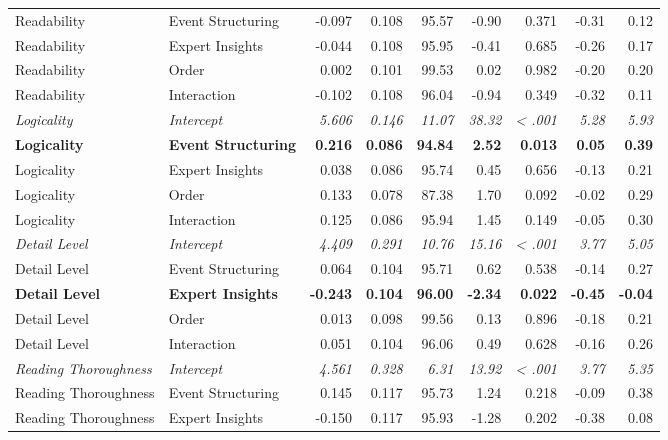\begin{longtable}{l l r r r r r r r}
  Readability & Event Structuring & -0.097 & 0.108 & 95.57 & -0.90 & 0.371 & -0.31 & 0.12\\*
  Readability & Expert Insights & -0.044 & 0.108 & 95.95 & -0.41 & 0.685 & -0.26 & 0.17\\*
  Readability & Order & 0.002 & 0.101 & 99.53 & 0.02 & 0.982 & -0.20 & 0.20\\*
  Readability & Interaction & -0.102 & 0.108 & 96.04 & -0.94 & 0.349 & -0.32 & 0.11\\
  \addlinespace
  \textit{Logicality} & \textit{Intercept} & \textit{5.606} & \textit{0.146} & \textit{11.07} & \textit{38.32} & \textit{< .001} & \textit{5.28} & \textit{5.93}\\*
  \textbf{Logicality} & \textbf{Event Structuring} & \textbf{0.216} & \textbf{0.086} & \textbf{94.84} & \textbf{2.52} & \textbf{0.013} & \textbf{0.05} & \textbf{0.39}\\*
  Logicality & Expert Insights & 0.038 & 0.086 & 95.74 & 0.45 & 0.656 & -0.13 & 0.21\\*
  Logicality & Order & 0.133 & 0.078 & 87.38 & 1.70 & 0.092 & -0.02 & 0.29\\*
  Logicality & Interaction & 0.125 & 0.086 & 95.94 & 1.45 & 0.149 & -0.05 & 0.30\\
  \addlinespace
  \textit{Detail Level} & \textit{Intercept} & \textit{4.409} & \textit{0.291} & \textit{10.76} & \textit{15.16} & \textit{< .001} & \textit{3.77} & \textit{5.05}\\*
  Detail Level & Event Structuring & 0.064 & 0.104 & 95.71 & 0.62 & 0.538 & -0.14 & 0.27\\*
  \textbf{Detail Level} & \textbf{Expert Insights} & \textbf{-0.243} & \textbf{0.104} & \textbf{96.00} & \textbf{-2.34} & \textbf{0.022} & \textbf{-0.45} & \textbf{-0.04}\\*
  Detail Level & Order & 0.013 & 0.098 & 99.56 & 0.13 & 0.896 & -0.18 & 0.21\\*
  Detail Level & Interaction & 0.051 & 0.104 & 96.06 & 0.49 & 0.628 & -0.16 & 0.26\\
  \addlinespace
  \textit{Reading Thoroughness} & \textit{Intercept} & \textit{4.561} & \textit{0.328} & \textit{6.31} & \textit{13.92} & \textit{< .001} & \textit{3.77} & \textit{5.35}\\*
  Reading Thoroughness & Event Structuring & 0.145 & 0.117 & 95.73 & 1.24 & 0.218 & -0.09 & 0.38\\*
  Reading Thoroughness & Expert Insights & -0.150 & 0.117 & 95.93 & -1.28 & 0.202 & -0.38 & 0.08\\*

\end{longtable}

